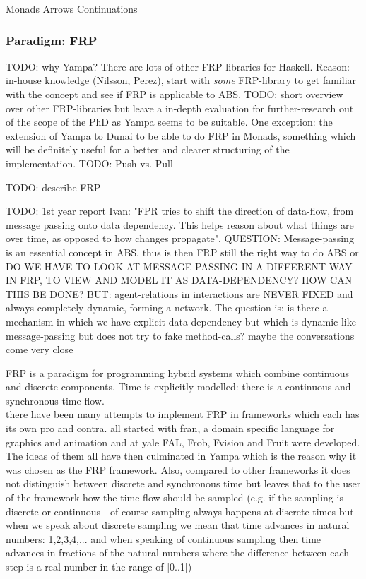 Monads
Arrows
Continuations
\subsubsection{Paradigm: FRP}
TODO: why Yampa? There are lots of other FRP-libraries for Haskell. Reason: in-house knowledge (Nilsson, Perez), start with \textit{some} FRP-library to get familiar with the concept and see if FRP is applicable to ABS. TODO: short overview over other FRP-libraries but leave a in-depth evaluation for further-research out of the scope of the PhD as Yampa seems to be suitable. One exception: the extension of Yampa to Dunai to be able to do FRP in Monads, something which will be definitely useful for a better and clearer structuring of the implementation.
TODO: Push vs. Pull

TODO: describe FRP

TODO: 1st year report Ivan: "FPR tries to shift the direction of data-flow, from message passing onto data dependency. This helps reason about what things are over time, as opposed to how changes propagate". QUESTION: Message-passing is an essential concept in ABS, thus is then FRP still the right way to do ABS or DO WE HAVE TO LOOK AT MESSAGE PASSING IN A DIFFERENT WAY IN FRP, TO VIEW AND MODEL IT AS DATA-DEPENDENCY? HOW CAN THIS BE DONE?
BUT: agent-relations in interactions are NEVER FIXED and always completely dynamic, forming a network. The question is: is there a mechanism in which we have explicit data-dependency but which is dynamic like message-passing but does not try to fake method-calls? maybe the conversations come very close


FRP is a paradigm for programming hybrid systems which combine continuous and discrete components. Time is explicitly modelled: there is a continuous and synchronous time flow.  \\

there have been many attempts to implement FRP in frameworks which each has its own pro and contra. all started with fran, a domain specific language for graphics and animation and at yale FAL, Frob, Fvision and Fruit were developed. The ideas of them all have then culminated in Yampa which is the reason why it was chosen as the FRP framework. Also, compared to other frameworks it does not distinguish between discrete and synchronous time but leaves that to the user of the framework how the time flow should be sampled (e.g. if the sampling is discrete or continuous - of course sampling always happens at discrete times but when we speak about discrete sampling we mean that time advances in natural numbers: 1,2,3,4,... and when speaking of continuous sampling then time advances in fractions of the natural numbers where the difference between each step is a real number in the range of [0..1]) \\

